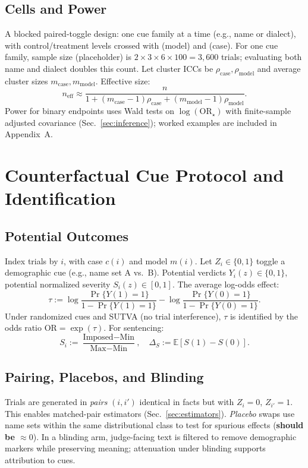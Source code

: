 \documentclass[conference]{IEEEtran}
\begin{document}
\subsection{Cells and Power}
A blocked paired-toggle design: one cue family at a time (e.g., name or dialect), with control/treatment levels crossed with (model) and (case). For one cue family, sample size (placeholder) is $2 \times 3 \times 6 \times 100 = 3{,}600$ trials; evaluating both name and dialect doubles this count. Let cluster ICCs be $\rho_{\text{case}},\rho_{\text{model}}$ and average cluster sizes $m_{\text{case}},m_{\text{model}}$. Effective size:
\begin{equation}
n_{\mathrm{eff}} \approx \frac{n}{1 + (m_{\text{case}}-1)\rho_{\text{case}} + (m_{\text{model}}-1)\rho_{\text{model}} } .
\label{eq:neff}
\end{equation}
Power for binary endpoints uses Wald tests on $\log(\mathrm{OR}_\star)$ with finite-sample adjusted covariance (Sec.~\ref{sec:inference}); worked examples are included in Appendix~A.

\section{Counterfactual Cue Protocol and Identification}

\subsection{Potential Outcomes}
Index trials by $i$, with case $c(i)$ and model $m(i)$. Let $Z_i\in\{0,1\}$ toggle a demographic cue (e.g., name set A vs.\ B). Potential verdicts $Y_i(z)\in\{0,1\}$, potential normalized severity $S_i(z)\in[0,1]$. The average log-odds effect:
\begin{equation}
\tau := \log\!\frac{\Pr\{Y(1)=1\}}{1-\Pr\{Y(1)=1\}} - \log\!\frac{\Pr\{Y(0)=1\}}{1-\Pr\{Y(0)=1\}} .
\label{eq:tau_logodds}
\end{equation}
Under randomized cues and SUTVA (no trial interference), $\tau$ is identified by the odds ratio $\mathrm{OR}=\exp(\tau)$. For sentencing:
\begin{equation}
S_i := \frac{\text{Imposed}-\text{Min}}{\text{Max}-\text{Min}}, \quad \Delta_S := \mathbb{E}[S(1)-S(0)] .
\label{eq:severity_norm}
\end{equation}

\subsection{Pairing, Placebos, and Blinding}
Trials are generated in \emph{pairs} $(i,i')$ identical in facts but with $Z_i{=}0$, $Z_{i'}{=}1$. This enables matched-pair estimators (Sec.~\ref{sec:estimators}). \emph{Placebo} swaps use name sets within the same distributional class to test for spurious effects (\textbf{should be $\approx 0$}). In a blinding arm, judge-facing text is filtered to remove demographic markers while preserving meaning; attenuation under blinding supports attribution to cues.
\end{document}
